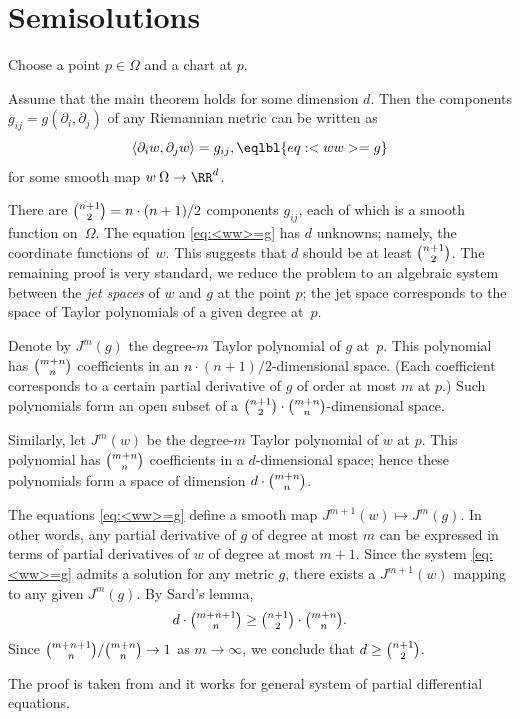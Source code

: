 \backmatter
\chapter{Semisolutions}

Choose a point $p\in\Omega$ and a chart at $p$.

Assume that the main theorem holds for some dimension $d$.
Then the components $g_{ij}=g(\partial_i,\partial_j)$ of any Riemannian metric can be written as
\[
\langle \partial_i w, \partial_j w \rangle = g_{ij},
\eqlbl{eq:<ww>=g}
\]
for some smooth map $w\:\Omega \to \RR^d$.

There are $\tbinom{n+1}{2}=n\cdot (n+1)/2$ components $g_{ij}$, each of which is a smooth function on~$\Omega$.
The equation \ref{eq:<ww>=g} has $d$ unknowns; namely, the coordinate functions of~$w$.
This suggests that $d$ should be at least $\tbinom{n+1}{2}$.
The remaining proof is very standard, we reduce the problem to an algebraic system between the \emph{jet spaces} of $w$ and $g$ at the point $p$; the jet space corresponds to the space of Taylor polynomials of a given degree at~$p$.

Denote by $J^m(g)$ the degree-$m$ Taylor polynomial of $g$ at~$p$.
This polynomial has $\tbinom{m+n}{n}$ coefficients in an $n \cdot (n+1)/2$-dimensional space.
(Each coefficient corresponds to a certain partial derivative of $g$ of order at most $m$ at $p$.)
Such polynomials form an open subset of a $\tbinom{n+1}{2} \cdot \tbinom{m+n}{n}$-dimensional space.

Similarly, let $J^m(w)$ be the degree-$m$ Taylor polynomial of $w$ at $p$.
This polynomial has $\tbinom{m+n}{n}$ coefficients in a $d$-dimensional space;
hence these polynomials form a space of dimension $d \cdot \tbinom{m+n}{n}$.

The equations \ref{eq:<ww>=g} define a smooth map $J^{m+1}(w)\mapsto J^m(g)$.
In other words, any partial derivative of $g$ of degree at most $m$ can be expressed in terms of partial derivatives of $w$ of degree at most $m+1$.
Since the system \ref{eq:<ww>=g} admits a solution for any metric $g$, there exists a $J^{m+1}(w)$ mapping to any given $J^m(g)$.
By Sard's lemma,
\[
d \cdot \tbinom{m+n+1}{n} \ge \tbinom{n+1}{2} \cdot  \tbinom{m+n}{n}.
\]
Since
$\tbinom{m+n+1}{n}/\tbinom{m+n}{n} \to 1$ as  $m \to \infty$, we conclude that $d \ge \tbinom{n+1}{2}$.

The proof is taken from \cite[Appendix I]{gromov-rokhlin} and it works for general system of partial differential equations.

